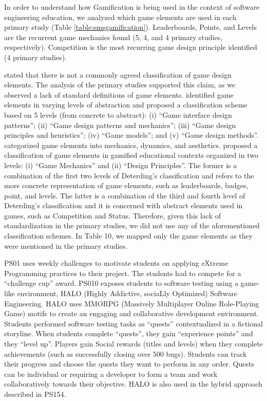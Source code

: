 In order to understand how Gamification is being used in the context of software engineering education, we analyzed which game elements are used in each primary study (Table \ref{table:smsgamification}). Leaderboards, Points, and Levels are the recurrent game mechanics found (5, 4, and 4 primary studies, respectively). Competition is the most recurring game design principle identified (4 primary studies).



\cite{Dicheva:2015} stated that there is not a commonly agreed classification of game design elements. The analysis of the primary studies supported this claim, as we observed a lack of standard definitions of game elements. \cite{Deterding:2011} identified game elements in varying levels of abstraction and proposed a classification scheme based on 5 levels (from concrete to abstract): (i) “Game interface design patterns”; (ii) “Game design patterns and mechanics”; (iii) “Game design principles and heuristics”; (iv) “Game models”; and (v) “Game design methods”.  \cite{Zichermann:2011} categorized game elements into mechanics, dynamics, and aesthetics. \cite{Dicheva:2015} proposed a classification of game elements in gamified educational contexts organized in two levels: (i) “Game Mechanics” and (ii) “Design Principles”. The former is a combination of the first two levels of Deterding’s classification and refers to the more concrete representation of game elements, such as leaderboards, badges, point, and levels. The latter is a combination of the third and fourth level of Deterding’s classification and it is concerned with abstract elements used in games, such as Competition and Status. Therefore, given this lack of standardization in the primary studies, we did not use any of the aforementioned classification schemes. In Table 10, we mapped only the game elements as they were mentioned in the primary studies.

PS01 uses weekly challenges to motivate students on applying eXtreme Programming practices to their project. The students had to compete for a “challenge cup” award. PS010 exposes students to software testing using a game-like environment, HALO (Highly Addictive, sociaLly Optimized) Software Engineering. HALO uses MMORPG (Massively Multiplayer Online Role-Playing Game) motifs to create an engaging and collaborative development environment. Students performed software testing tasks as “quests” contextualized in a fictional storyline. When students complete “quests”, they gain “experience points” and they “level up”. Players gain Social rewards (titles and levels) when they complete achievements (such as successfully closing over 500 bugs). Students can track their progress and choose the quests they want to perform in any order. Quests can be individual or requiring a developer to form a team and work collaboratively towards their objective. HALO is also used in the hybrid approach described in PS154.

